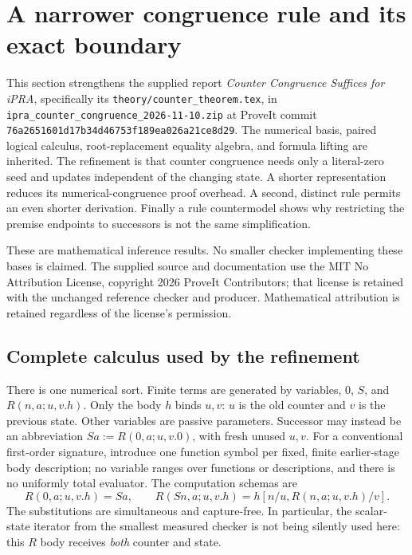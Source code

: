 \documentclass[11pt,letterpaper]{article}
\theoremstyle{definition}\newtheorem{definition}[theorem]{Definition}
\theoremstyle{remark}\newtheorem{remark}[theorem]{Remark}
\begin{document}
\clearpage
\section{A narrower congruence rule and its exact boundary}
\label{zcc:section}

This section strengthens the supplied report \emph{Counter Congruence
Suffices for iPRA}, specifically its \texttt{theory/counter\_theorem.tex},
in \texttt{ipra\_counter\_congruence\_2026-11-10.zip} at ProveIt commit
\texttt{76a2651601d17b34d46753f189ea026a21ce8d29}. The numerical basis,
paired logical calculus, root-replacement equality algebra, and formula
lifting are inherited. The refinement is that counter congruence needs
only a literal-zero seed and updates independent of the changing state.
A shorter representation reduces its numerical-congruence proof overhead.
A second, distinct rule permits an even shorter derivation. Finally a
rule countermodel shows why restricting the premise endpoints to
successors is not the same simplification.

These are mathematical inference results. No smaller checker implementing
these bases is claimed. The supplied source and documentation use the
MIT No Attribution License, copyright 2026 ProveIt Contributors; that
license is retained with the unchanged reference checker and producer.
Mathematical attribution is retained regardless of the license's permission.

\subsection{Complete calculus used by the refinement}

There is one numerical sort. Finite terms are generated by variables,
$0$, $S$, and $R(n,a;u,v.h)$. Only the body $h$ binds $u,v$: $u$ is the
old counter and $v$ is the previous state. Other variables are passive
parameters. Successor may instead be an abbreviation
$Sa:=R(0,a;u,v.0)$, with fresh unused $u,v$. For a conventional first-order
signature, introduce one function symbol per fixed, finite earlier-stage
body description; no variable ranges over functions or descriptions, and
there is no uniformly total evaluator. The computation schemas are
\[
 R(0,a;u,v.h)=Sa,\qquad
 R(Sn,a;u,v.h)=h[n/u,R(n,a;u,v.h)/v].
 \tag{R0, RS}\label{zcc:computation}
\]
The substitutions are simultaneous and capture-free. In particular,
the scalar-state iterator from the smallest measured checker is not being
silently used here: this $R$ body receives \emph{both} counter and state.
\end{document}
